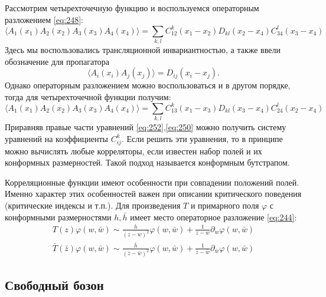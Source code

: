 \documentclass[a4paper,12pt]{article}
\theoremstyle{definition}
\theoremstyle{definition}
\theoremstyle{definition}
\begin{document}
Рассмотрим четырехточечную функцию и воспользуемся операторным разложением \eqref{eq:248}:
\begin{equation}
  \label{eq:250}
  \langle A_{1}(x_{1}) A_{2}(x_{2}) A_{3}(x_{3}) A_{4}(x_{4}) \rangle =\sum_{k,l} C^{k}_{12} (x_{1}-x_{2}) D_{kl}(x_{2}-x_{4}) C^{l}_{34}(x_{3}-x_{4}) 
\end{equation}
Здесь мы воспользовались трансляционной инвариантностью, а также ввели обозначение для пропагатора
\begin{equation}
  \label{eq:251}
  \langle A_{i}(x_{i}) A_{j}(x_{j}) \rangle =D_{ij}(x_{i}-x_{j}).
\end{equation}
Однако операторным разложением можно воспользоваться и в другом порядке, тогда для четырехточечной функции получим:
\begin{equation}
  \label{eq:252}
  \langle A_{1}(x_{1}) A_{2}(x_{2}) A_{3}(x_{3}) A_{4}(x_{4}) \rangle =\sum_{k,l} C^{k}_{13} (x_{1}-x_{3}) D_{kl}(x_{3}-x_{4}) C^{l}_{24}(x_{2}-x_{4})   
\end{equation}
Приравняв правые части уравнений \eqref{eq:252},\eqref{eq:250} можно получить систему уравнений на коэффициенты $C^{k}_{ij}$. Если решить эти уравнения, то в принципе можно вычислять любые корреляторы, если известен набор полей и их конформных размерностей. Такой подход называется конформным бутстрапом. 

Корреляционные функции имеют особенности при совпадении положений полей. Именно характер этих особенностей важен при описании критического поведения (критические индексы и т.п.).
Для произведения $T$ и примарного поля $\varphi$ с конформными размерностями $h,\bar h$ имеет место операторное разложение \eqref{eq:244}:
\begin{eqnarray}
  \label{eq:253}
  T(z) \varphi(w,\bar w)\sim \frac{h}{(z-w)^{2}} \varphi(w,\bar w)+\frac{1}{z-w} \partial_{w} \varphi(w,\bar w)\\
  \bar T(\bar z) \varphi(w,\bar w)\sim \frac{\bar h}{(\bar z-\bar w)^{2}} \varphi(w,\bar w)+\frac{1}{\bar z-\bar w} \partial_{\bar w} \varphi(w,\bar w)  
\end{eqnarray}

\subsection{Свободный бозон}
\label{sec:free-boson}
\end{document}
